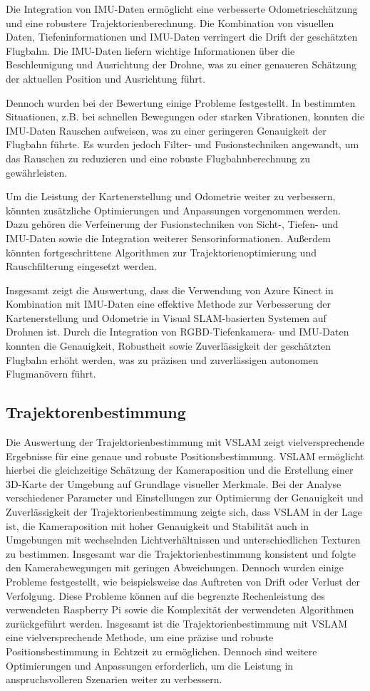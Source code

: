 Die Integration von \ac{IMU}-Daten ermöglicht eine verbesserte Odometrieschätzung und eine robustere Trajektorienberechnung. Die Kombination von visuellen Daten, Tiefeninformationen und IMU-Daten verringert die Drift der geschätzten Flugbahn. Die \ac{IMU}-Daten liefern wichtige Informationen über die Beschleunigung und Ausrichtung der Drohne, was zu einer genaueren Schätzung der aktuellen Position und Ausrichtung führt.

Dennoch wurden bei der Bewertung einige Probleme festgestellt. In bestimmten Situationen, z.B. bei schnellen Bewegungen oder starken Vibrationen, konnten die \ac{IMU}-Daten Rauschen aufweisen, was zu einer geringeren Genauigkeit der Flugbahn führte. Es wurden jedoch Filter- und Fusionstechniken angewandt, um das Rauschen zu reduzieren und eine robuste Flugbahnberechnung zu gewährleisten.

Um die Leistung der Kartenerstellung und Odometrie weiter zu verbessern, könnten zusätzliche Optimierungen und Anpassungen vorgenommen werden. Dazu gehören die Verfeinerung der Fusionstechniken von Sicht-, Tiefen- und IMU-Daten sowie die Integration weiterer Sensorinformationen. Außerdem könnten fortgeschrittene Algorithmen zur Trajektorienoptimierung und Rauschfilterung eingesetzt werden.

Insgesamt zeigt die Auswertung, dass die Verwendung von Azure Kinect in Kombination mit \ac{IMU}-Daten eine effektive Methode zur Verbesserung der Kartenerstellung und Odometrie in Visual SLAM-basierten Systemen auf Drohnen ist. Durch die Integration von RGBD-Tiefenkamera- und \ac{IMU}-Daten konnten die Genauigkeit, Robustheit sowie Zuverlässigkeit der geschätzten Flugbahn erhöht werden, was zu präzisen und zuverlässigen autonomen Flugmanövern führt.

\subsection{Trajektorenbestimmung}
Die Auswertung der Trajektorienbestimmung mit \ac{VSLAM} zeigt vielversprechende Ergebnisse für eine genaue und robuste Positionsbestimmung. \ac{VSLAM} ermöglicht hierbei die gleichzeitige Schätzung der Kameraposition und die Erstellung einer 3D-Karte der Umgebung auf Grundlage visueller Merkmale. Bei der Analyse verschiedener Parameter und Einstellungen zur Optimierung der Genauigkeit und Zuverlässigkeit der Trajektorienbestimmung zeigte sich, dass \ac{VSLAM} in der Lage ist, die Kameraposition mit hoher Genauigkeit und Stabilität auch in Umgebungen mit wechselnden Lichtverhältnissen und unterschiedlichen Texturen zu bestimmen. Insgesamt war die Trajektorienbestimmung konsistent und folgte den Kamerabewegungen mit geringen Abweichungen. Dennoch wurden einige Probleme festgestellt, wie beispielsweise das Auftreten von Drift oder Verlust der Verfolgung. Diese Probleme können auf die begrenzte Rechenleistung des verwendeten Raspberry Pi sowie die Komplexität der verwendeten Algorithmen zurückgeführt werden. Insgesamt ist die Trajektorienbestimmung mit \ac{VSLAM} eine vielversprechende Methode, um eine präzise und robuste Positionsbestimmung in Echtzeit zu ermöglichen. Dennoch sind weitere Optimierungen und Anpassungen erforderlich, um die Leistung in anspruchsvolleren Szenarien weiter zu verbessern.
